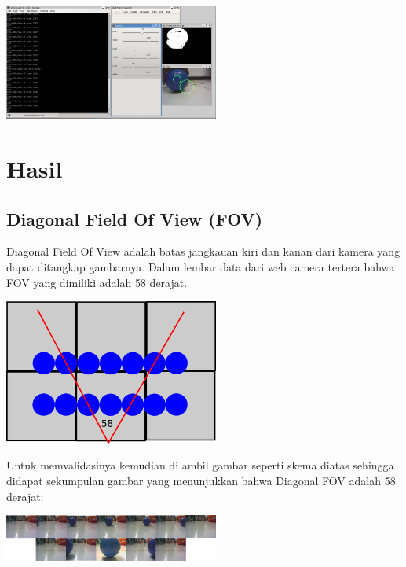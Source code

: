 \documentclass[10pt,journal,compsoc]{IEEEtran}
\begin{document}
  \begin{center}
    \includegraphics[width=200pt]{softpic}\\
  \end{center}
  
  \section{Hasil}
  
  \subsection{Diagonal Field Of View (FOV)}
  Diagonal Field Of View adalah batas jangkauan kiri dan kanan dari kamera yang dapat ditangkap gambarnya.
  Dalam lembar data dari web camera tertera bahwa FOV yang dimiliki adalah 58 derajat.
  \begin{center}
    \includegraphics[width=200pt]{fov}\\
  \end{center}
  Untuk memvalidasinya kemudian di ambil gambar seperti skema diatas sehingga didapat sekumpulan gambar yang menunjukkan bahwa Diagonal FOV adalah 58 derajat:
  \begin{center}
    \includegraphics[width=200pt]{data_fov}\\
  \end{center}
  
\end{document}
